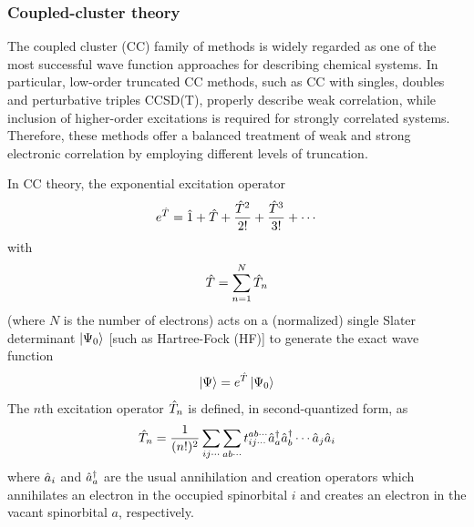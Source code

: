 \documentclass[aip,jcp,reprint,noshowkeys,superscriptaddress]{revtex4-1}
\newcommand{\hT}{\Hat{T}}
\newcommand{\hI}{\Hat{1}}
\begin{document}
\subsubsection*{Coupled-cluster theory}
The coupled cluster (CC) family of methods is widely regarded as one of the most successful wave function approaches for describing chemical systems. \cite{ShavittBook,Crawford_2000}  
In particular, low-order truncated CC methods, such as CC with singles, doubles and perturbative triples CCSD(T), properly describe weak correlation, while inclusion of higher-order excitations is required for strongly correlated systems. Therefore, these methods offer a balanced treatment of weak and strong electronic correlation by employing different levels of truncation.

In CC theory, the exponential excitation operator 
\begin{equation}
	e^{\hT} = \hI + \hT + \frac{\hT^2}{2!} + \frac{\hT^3}{3!} + \cdots
\end{equation}
with 
\begin{equation}
	\hT = \sum_{n=1}^N \hT_n
\end{equation}
(where $N$ is the number of electrons) acts on a (normalized) single Slater determinant $\ket{\Psi_0}$ [such as Hartree-Fock (HF)] to generate the exact wave function 
\begin{equation}
	\ket{\Psi} = e^{\hT} \ket{\Psi_0}
\end{equation}
The $n$th excitation operator $\hT_n$ is defined, in second-quantized form, as
\begin{equation}
	\label{eq:T_k}
	\hT_n = \frac{1}{(n!)^2} \sum_{ij\cdots} \sum_{ab\cdots} t_{ij\cdots}^{ab\cdots} \Hat{a}_a^{\dag} \Hat{a}_b^{\dag} \cdots \Hat{a}_j \Hat{a}_i
\end{equation}
where $\Hat{a}_i$ and $\Hat{a}_a^{\dag}$ are the usual annihilation and creation operators which annihilates an electron in the occupied spinorbital $i$ and creates an electron in the vacant spinorbital $a$, respectively.
\end{document}
